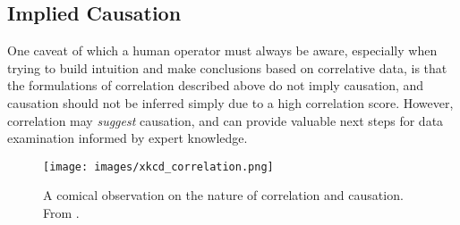 \subsection{Implied Causation}

One caveat of which a human operator must always be aware, especially when trying to build intuition and make conclusions based on correlative data, is that the formulations of correlation described above do not imply causation, and causation should not be inferred simply due to a high correlation score. However, correlation may \textit{suggest} causation, and can provide valuable next steps for data examination informed by expert knowledge.

\begin{figure}[h]
\centering
    \texttt{[image: images/xkcd\_correlation.png]}
    \caption{A comical observation on the nature of correlation and causation. From \cite{xkcd_correlation}.}
    \label{fig:xkcd_correction}
\end{figure}










